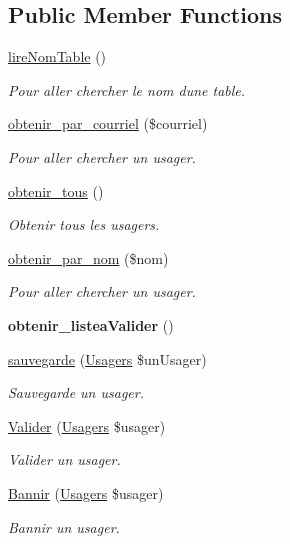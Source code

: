 \subsection*{Public Member Functions}
\begin{DoxyCompactItemize}
\item 
\hyperlink{class_modele_usagers_a42d4bd0440380ccaec209c06c3d69a81}{lire\+Nom\+Table} ()
\begin{DoxyCompactList}\small\item\em Pour aller chercher le nom d\textquotesingle{}une table. \end{DoxyCompactList}\item 
\hyperlink{class_modele_usagers_a6a5533c1d0bb2106609c7d72dee7b09f}{obtenir\+\_\+par\+\_\+courriel} (\$courriel)
\begin{DoxyCompactList}\small\item\em Pour aller chercher un usager. \end{DoxyCompactList}\item 
\hyperlink{class_modele_usagers_a26c77b2091c8f8d01cfbaa5d3f257d44}{obtenir\+\_\+tous} ()
\begin{DoxyCompactList}\small\item\em Obtenir tous les usagers. \end{DoxyCompactList}\item 
\hyperlink{class_modele_usagers_a7d226551960685ce4ec5bd09a4410c05}{obtenir\+\_\+par\+\_\+nom} (\$nom)
\begin{DoxyCompactList}\small\item\em Pour aller chercher un usager. \end{DoxyCompactList}\item 
\mbox{\label{class_modele_usagers_a2fb44dad5609c861cbb86fa61b57da4e}} 
{\bfseries obtenir\+\_\+listea\+Valider} ()
\item 
\hyperlink{class_modele_usagers_a10d5d6667e96fbe193e01ecd222c3f84}{sauvegarde} (\hyperlink{class_usagers}{Usagers} \$un\+Usager)
\begin{DoxyCompactList}\small\item\em Sauvegarde un usager. \end{DoxyCompactList}\item 
\hyperlink{class_modele_usagers_aa452073e6ad4609ad1e6a51db469c6ed}{Valider} (\hyperlink{class_usagers}{Usagers} \$usager)
\begin{DoxyCompactList}\small\item\em Valider un usager. \end{DoxyCompactList}\item 
\hyperlink{class_modele_usagers_a2de8c1b03745c32172436332394963e9}{Bannir} (\hyperlink{class_usagers}{Usagers} \$usager)
\begin{DoxyCompactList}\small\item\em Bannir un usager. \end{DoxyCompactList}\end{DoxyCompactItemize}
